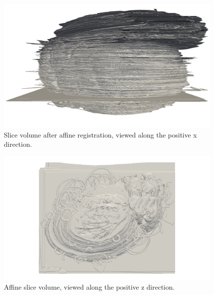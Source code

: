 	\begin{figure}
	  \centering
	  \includegraphics[width=0.9\textheight]{Ch6/Figs/Rat28/contours/whole_positive_x_affine}
	  \caption{Slice volume after affine registration, viewed along the positive x direction.}
	  \label{fig:positive_x_affine_contour}
	\end{figure}

	\begin{figure}
	  \centering
	  \includegraphics[width=0.9\textheight]{Ch6/Figs/Rat28/contours/whole_positive_z_affine}
	  \caption{Affine slice volume, viewed along the positive z direction.}
	  \label{fig:positive_z_affine_contour}
	\end{figure}
	
